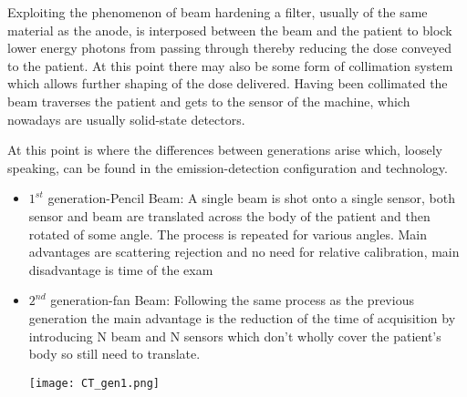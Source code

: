 Exploiting the phenomenon of beam hardening a filter, usually of the same material as the anode, is interposed between the beam and the patient to block lower energy photons from passing through thereby reducing the dose conveyed to the patient. At this point there may also be some form of collimation system which allows further shaping of the dose delivered. Having been collimated the beam traverses the patient and gets to the sensor of the machine, which nowadays are usually solid-state detectors.

At this point is where the differences between generations arise which, loosely speaking, can be found in the emission-detection configuration and technology.

\begin{itemize}
\item $1^{st}$ generation-Pencil Beam: A single beam is shot onto a single sensor, both sensor and beam are translated across the body of the patient and then rotated of some angle. The process is repeated for various angles. Main advantages are scattering rejection and no need for relative calibration, main disadvantage is time of the exam
\item $2^{nd}$ generation-fan Beam: Following the same process as the previous generation the main advantage is the reduction of the time of acquisition by introducing N beam and N sensors which don't wholly cover the patient's body so still need to translate.

\begin{minipage}{\linewidth}
            \centering
            \texttt{[image: CT\_gen1.png]}
        \end{minipage}


\end{itemize}
